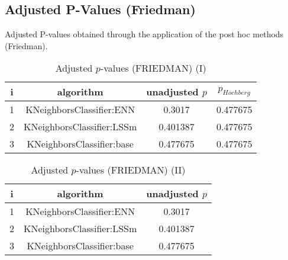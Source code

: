 \documentclass[a4paper,10pt]{article}
\begin{document}
\begin{landscape}
\section{Adjusted P-Values (Friedman)}


Adjusted P-values obtained through the application of the post hoc methods (Friedman).

\begin{table}[!htp]
\centering\small
\begin{tabular}{cccc}
i&algorithm&unadjusted $p$&$p_{Hochberg}$\\
\hline1&KNeighborsClassifier:ENN&0.3017&0.477675\\2&KNeighborsClassifier:LSSm&0.401387&0.477675\\3&KNeighborsClassifier:base&0.477675&0.477675\\\hline
\end{tabular}
\caption{Adjusted $p$-values (FRIEDMAN) (I)}
\end{table}
\begin{table}[!htp]
\centering\small
\begin{tabular}{ccc}
i&algorithm&unadjusted $p$\\
\hline1&KNeighborsClassifier:ENN&0.3017\\2&KNeighborsClassifier:LSSm&0.401387\\3&KNeighborsClassifier:base&0.477675\\\hline
\end{tabular}
\caption{Adjusted $p$-values (FRIEDMAN) (II)}
\end{table}

\newpage
\end{landscape}
\end{document}
